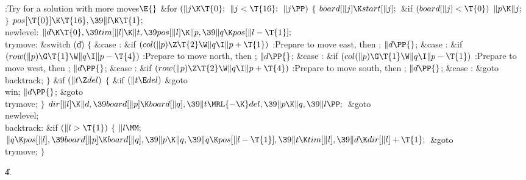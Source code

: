 \Y\B\4:Try for a solution with  more moves\X${}\E{}$\6
\&{for} ${}(\|j\K\T{0};{}$ ${}\|j<\T{16};{}$ ${}\|j\PP){}$\5
${}\{{}$\1\6
${}\\{board}[\|j]\K\\{start}[\|j];{}$\6
\&{if} ${}(\\{board}[\|j]<\T{0}){}$\1\5
${}\|p\K\|j;{}$\2\6
\4${}\}{}$\2\6
${}\\{pos}[\T{0}]\K\T{16},\39\|l\K\T{1};{}$\6
\4\\{newlevel}:\5
${}\|d\K\T{0},\39\\{tim}[\|l]\K\|t,\39\\{pos}[\|l]\K\|p,\39\|q\K\\{pos}[\|l-%
\T{1}];{}$\6
\4\\{trymove}:\5
\&{switch} (\|d)\5
${}\{{}$\1\6
\4\&{case} :\5
\&{if} ${}(\\{col}(\|p)\Z\T{2}\W\|q\I\|p+\T{1}){}$\1\5
:Prepare to move east, then \X;\2\6
${}\|d\PP{}$;\6
\4\&{case} :\5
\&{if} ${}(\\{row}(\|p)\G\T{1}\W\|q\I\|p-\T{4}){}$\1\5
:Prepare to move north, then \X;\2\6
${}\|d\PP{}$;\6
\4\&{case} :\5
\&{if} ${}(\\{col}(\|p)\G\T{1}\W\|q\I\|p-\T{1}){}$\1\5
:Prepare to move west, then \X;\2\6
${}\|d\PP{}$;\6
\4\&{case} :\5
\&{if} ${}(\\{row}(\|p)\Z\T{2}\W\|q\I\|p+\T{4}){}$\1\5
:Prepare to move south, then \X;\2\6
${}\|d\PP{}$;\6
\4\&{case} :\5
\&{goto} \\{backtrack};\6
\4${}\}{}$\2\6
\&{if} ${}(\|t\Z\\{del}){}$\5
${}\{{}$\1\6
\&{if} ${}(\|t\E\\{del}){}$\1\5
\&{goto} \\{win};\2\6
${}\|d\PP{}$;\5
\&{goto} \\{trymove};\6
\4${}\}{}$\2\6
${}\\{dir}[\|l]\K\|d,\39\\{board}[\|p]\K\\{board}[\|q],\39\|t\MRL{-{\K}}%
\\{del},\39\|p\K\|q,\39\|l\PP;{}$\6
\&{goto} \\{newlevel};\6
\4\\{backtrack}:\5
\&{if} ${}(\|l>\T{1}){}$\5
${}\{{}$\1\6
${}\|l\MM;{}$\6
${}\|q\K\\{pos}[\|l],\39\\{board}[\|p]\K\\{board}[\|q],\39\|p\K\|q,\39\|q\K%
\\{pos}[\|l-\T{1}],\39\|t\K\\{tim}[\|l],\39\|d\K\\{dir}[\|l]+\T{1};{}$\6
\&{goto} \\{trymove};\6
\4${}\}{}$\2\par
\U4.\fi

